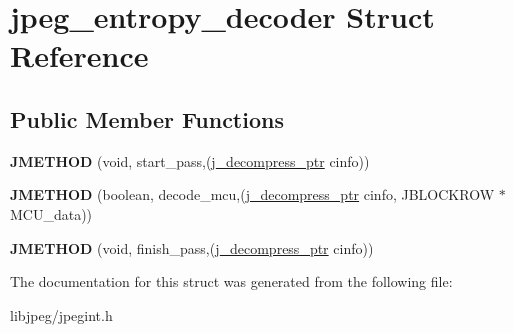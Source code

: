\hypertarget{structjpeg__entropy__decoder}{\section{jpeg\-\_\-entropy\-\_\-decoder Struct Reference}
\label{structjpeg__entropy__decoder}
}
\subsection*{Public Member Functions}
\begin{DoxyCompactItemize}
\item 
\hypertarget{structjpeg__entropy__decoder_ab1b90e7d9348599cecc7b6c86d291ae4}{{\bfseries J\-M\-E\-T\-H\-O\-D} (void, start\-\_\-pass,(\hyperlink{structjpeg__decompress__struct}{j\-\_\-decompress\-\_\-ptr} cinfo))}\label{structjpeg__entropy__decoder_ab1b90e7d9348599cecc7b6c86d291ae4}

\item 
\hypertarget{structjpeg__entropy__decoder_a151f6f7497ba68935cca4b28ee75a596}{{\bfseries J\-M\-E\-T\-H\-O\-D} (boolean, decode\-\_\-mcu,(\hyperlink{structjpeg__decompress__struct}{j\-\_\-decompress\-\_\-ptr} cinfo, J\-B\-L\-O\-C\-K\-R\-O\-W $\ast$M\-C\-U\-\_\-data))}\label{structjpeg__entropy__decoder_a151f6f7497ba68935cca4b28ee75a596}

\item 
\hypertarget{structjpeg__entropy__decoder_af016a41a26657b3f056b2edbc0d24014}{{\bfseries J\-M\-E\-T\-H\-O\-D} (void, finish\-\_\-pass,(\hyperlink{structjpeg__decompress__struct}{j\-\_\-decompress\-\_\-ptr} cinfo))}\label{structjpeg__entropy__decoder_af016a41a26657b3f056b2edbc0d24014}

\end{DoxyCompactItemize}


The documentation for this struct was generated from the following file\-:\begin{DoxyCompactItemize}
\item 
libjpeg/jpegint.\-h\end{DoxyCompactItemize}
